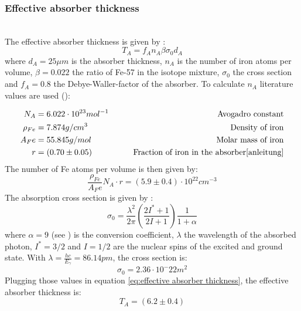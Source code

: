 \subsubsection{Effective absorber thickness}
\label{sec:effab}
 \ \\
The effective absorber thickness is given by \cite{anleitung}:
\begin{equation}
T_A = f_An_A\beta\sigma_0d_A
\label{eq:effective absorber thickness}
\end{equation}
where $d_A = 25\mu m$ is the absorber thickness, $n_A$ is the number of iron atoms per volume, $\beta=0.022$ the ratio of Fe-57 in the isotope mixture, $\sigma_0$ the cross section and $f_A=0.8$ the Debye-Waller-factor of the absorber.
To calculate $n_A$ literature values are used (\cite{webelements}):

\begin{equation*}
\begin{aligned}
N_A &= 6.022 \cdot 10^{23} mol^{-1} \qquad& \text{Avogadro constant}\\
\rho_{Fe} &= 7.874 g/cm^3 \qquad& \text{Density of iron} \\
A_Fe &= 55.845 g/mol \qquad& \text{Molar mass of iron}\\
r &=  (0.70\pm0.05) \qquad& \text{Fraction of iron in the absorber\cite{anleitung}}
\end{aligned}
\end{equation*}
The number of Fe atoms per volume is then given by:
\begin{equation*}
\frac{\rho_{Fe}}{A_Fe}N_A\cdot r= (5.9\pm0.4)\cdot 10^{22} cm^{-3}
\end{equation*}
The absorption cross section is given by \cite{Wegener}:
\begin{equation}
\sigma_0= \frac{\lambda^2}{2\pi} \left(\frac{2I^*+1}{2I+1}\right) \frac{1}{1+\alpha}
\end{equation}
where $\alpha =9$ (see \cite{Wegener}) is the conversion coefficient, $\lambda$ the wavelength of the absorbed photon, $I^*=3/2$ and $I=1/2$  are the nuclear spins of the excited and ground state. With $\lambda = \frac{hc}{E_\gamma}=86.14 pm$, the cross section is:
\begin{equation}
\sigma_0=2.36\cdot 10^-22m^2
\end{equation}
Plugging those values in equation \ref{eq:effective absorber thickness}, the effective absorber thickness is:
\begin{equation}
T_A = (6.2\pm 0.4)
\end{equation}
